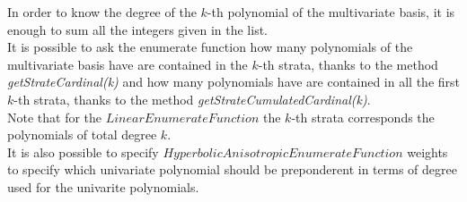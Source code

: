 In order to know the degree of the $k$-th polynomial of the multivariate basis, it is enough to sum all the integers given in the list.\\
It is possible to ask the enumerate function how many polynomials of the multivariate basis have are contained in the $k$-th strata, thanks to the method {\itshape getStrateCardinal(k)} and how many polynomials have are contained in all the first $k$-th strata, thanks to the method {\itshape getStrateCumulatedCardinal(k)}.\\
Note that for the $LinearEnumerateFunction$ the $k$-th strata corresponds the polynomials of total degree $k$.\\
It is also possible to specify $HyperbolicAnisotropicEnumerateFunction$ weights to specify which univariate polynomial should be preponderent in terms of degree used for the univarite polynomials.\\

\vspace*{0.1cm}

